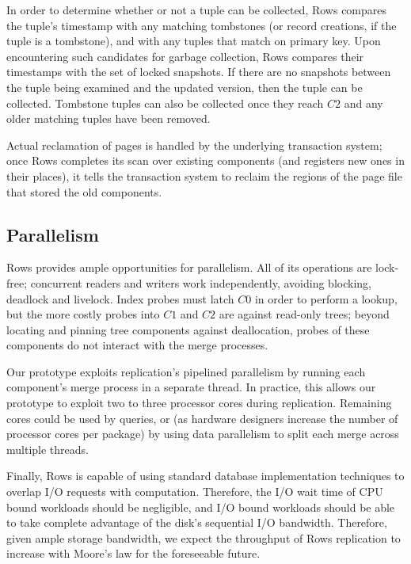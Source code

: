 \documentclass{sig-alternate-sigmod08}
\newcommand{\rows}{Rows\xspace}
\begin{document}
In order to determine whether or not a tuple can be collected, \rows
compares the tuple's timestamp with any matching tombstones (or record
creations, if the tuple is a tombstone), and with any tuples that
match on primary key.  Upon encountering such candidates for garbage collection,
\rows compares their timestamps with the set of locked snapshots.  If
there are no snapshots between the tuple being examined and the
updated version, then the tuple can be collected.  Tombstone tuples can
also be collected once they reach $C2$ and any older matching tuples
have been removed.

Actual reclamation of pages is handled by the underlying transaction
system; once \rows completes its scan over existing components (and
registers new ones in their places), it tells the transaction system
to reclaim the regions of the page file that stored the old components.

\subsection{Parallelism}

\rows provides ample opportunities for parallelism.  All of its
operations are lock-free; concurrent readers and writers work
independently, avoiding blocking, deadlock and livelock.  Index probes
must latch $C0$ in order to perform a lookup, but the more costly
probes into $C1$ and $C2$ are against read-only trees; beyond locating
and pinning tree components against deallocation, probes of these
components do not interact with the merge processes.

Our prototype exploits replication's pipelined parallelism by running
each component's merge process in a separate thread.  In practice,
this allows our prototype to exploit two to three processor cores
during replication.  Remaining cores could be used by queries, or (as
hardware designers increase the number of processor cores per package)
by using data parallelism to split each merge across multiple threads.

Finally, \rows is capable of using standard database implementation
techniques to overlap I/O requests with computation.  Therefore, the
I/O wait time of CPU bound workloads should be negligible, and I/O
bound workloads should be able to take complete advantage of the
disk's sequential I/O bandwidth.  Therefore, given ample storage
bandwidth, we expect the throughput of \rows replication to increase
with Moore's law for the foreseeable future.
\end{document}
